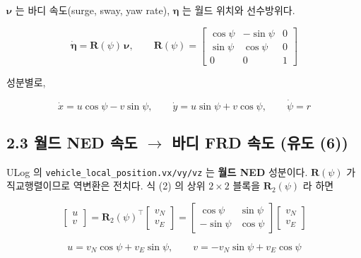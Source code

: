 \documentclass[10pt,a4paper]{article}
\begin{document}
$\boldsymbol{\nu}$ 는 바디 속도(surge, sway, yaw rate), $\boldsymbol{\eta}$ 는 월드 위치와 선수방위다.

\begin{equation*}
\dot{\boldsymbol{\eta}} = \mathbf{R}(\psi)\,\boldsymbol{\nu}, \qquad
\mathbf{R}(\psi) = \begin{bmatrix}
\cos\psi & -\sin\psi & 0 \\
\sin\psi & \cos\psi & 0 \\
0 & 0 & 1
\end{bmatrix} \tag{2}
\end{equation*}

성분별로,

\begin{equation*}
\dot{x} = u\cos\psi - v\sin\psi, \qquad
\dot{y} = u\sin\psi + v\cos\psi, \qquad
\dot{\psi} = r \tag{3}
\end{equation*}

\subsection*{2.3 월드 NED 속도 $\to$ 바디 FRD 속도 (유도 (6))}

ULog 의 \texttt{vehicle\_local\_position.vx/\discretionary{}{}{}vy/\discretionary{}{}{}vz} 는 \textbf{월드 NED} 성분이다. $\mathbf{R}(\psi)$ 가 직교행렬이므로 역변환은 전치다. 식 (2) 의 상위 $2\times2$ 블록을 $\mathbf{R}_2(\psi)$ 라 하면

\begin{equation*}
\begin{bmatrix} u \\ v \end{bmatrix}
= \mathbf{R}_2(\psi)^{\!\top} \begin{bmatrix} v_N \\ v_E \end{bmatrix}
= \begin{bmatrix} \cos\psi & \sin\psi \\ -\sin\psi & \cos\psi \end{bmatrix}
\begin{bmatrix} v_N \\ v_E \end{bmatrix} \tag{4}
\end{equation*}

\begin{equation*}
\boxed{\;u = v_N\cos\psi + v_E\sin\psi, \qquad v = -v_N\sin\psi + v_E\cos\psi\;} \tag{5}
\end{equation*}
\end{document}
